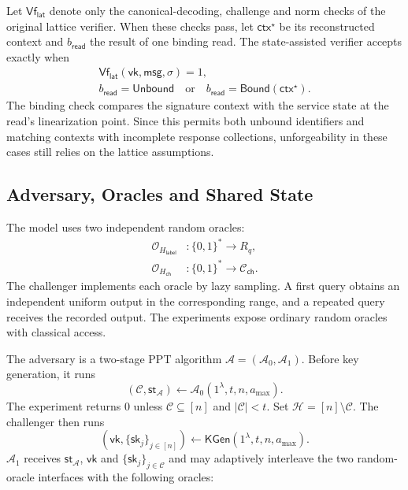 \documentclass[lettersize,journal]{IEEEtran}
\begin{document}
Let $\mathsf{Vf}_{\mathsf{lat}}$ denote only the canonical-decoding,
challenge and norm checks of the original lattice verifier. When these
checks pass, let $\mathsf{ctx}^{\star}$ be its reconstructed context and
$b_{\mathsf{read}}$ the result of one binding read. The state-assisted
verifier accepts exactly when
\[
\begin{gathered}
\mathsf{Vf}_{\mathsf{lat}}(\mathsf{vk},\mathsf{msg},\sigma)=1,\\
b_{\mathsf{read}}=\mathsf{Unbound}
\quad\text{or}\quad
b_{\mathsf{read}}=\mathsf{Bound}(\mathsf{ctx}^{\star}).
\end{gathered}
\]
The binding check compares the signature context with the service state at
the read's linearization point. Since this permits both unbound
identifiers and matching contexts with incomplete response collections,
unforgeability in these cases still relies on the lattice assumptions.

\subsection{Adversary, Oracles and Shared State}
The model uses two independent random oracles:
\[
\begin{aligned}
\mathcal O_{H_{\mathsf{label}}}&:\{0,1\}^{*}\to R_q,\\
\mathcal O_{H_{\mathsf{ch}}}&:\{0,1\}^{*}\to\mathcal C_{\mathsf{ch}}.
\end{aligned}
\]
The challenger implements each oracle by lazy sampling. A first query
obtains an independent uniform output in the corresponding range, and a
repeated query receives the recorded output. The experiments expose
ordinary random oracles with classical access.

The adversary is a two-stage PPT algorithm
$\mathcal A=(\mathcal A_0,\mathcal A_1)$. Before key generation, it runs
\[
(\mathcal C,\mathsf{st}_{\mathcal A})\leftarrow
\mathcal A_0(1^\lambda,t,n,a_{\max}).
\]
The experiment returns $0$ unless $\mathcal C\subseteq[n]$ and
$|\mathcal C|<t$. Set $\mathcal H=[n]\setminus\mathcal C$. The challenger
then runs
\[
(\mathsf{vk},\{\mathsf{sk}_j\}_{j\in[n]})\leftarrow
\mathsf{KGen}(1^\lambda,t,n,a_{\max}).
\]
$\mathcal A_1$ receives $\mathsf{st}_{\mathcal A}$, $\mathsf{vk}$ and
$\{\mathsf{sk}_j\}_{j\in\mathcal C}$ and may adaptively interleave the
two random-oracle interfaces with the following oracles:
\end{document}
